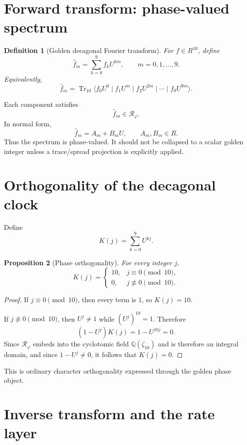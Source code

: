\documentclass[11pt]{article}
\newtheorem{definition}{Definition}[section]
\newtheorem{proposition}[definition]{Proposition}
\newcommand{\Tr}{\operatorname{Tr}}
\newcommand{\ph}{\varphi}
\newcommand{\Q}{\mathbb{Q}}
\newcommand{\RR}{\mathcal R_\ph}
\newcommand{\zz}{\zeta}
\begin{document}
\section{Forward transform: phase-valued spectrum}

\begin{definition}[Golden decagonal Fourier transform]
For $f\in R^{10}$, define
\[
    \widehat f_m=\sum_{k=0}^{9} f_kU^{km},
    \qquad
    m=0,1,\ldots,9.
\]
Equivalently,
\[
    \widehat f_m=
    \Tr_{10}\langle
        f_0U^0\mid f_1U^m\mid f_2U^{2m}\mid\cdots\mid f_9U^{9m}
    \rangle.
\]
\end{definition}

Each component satisfies
\[
    \widehat f_m\in\RR.
\]
In normal form,
\[
    \widehat f_m=A_m+B_mU,
    \qquad
    A_m,B_m\in R.
\]
Thus the spectrum is phase-valued.  It should not be collapsed to a scalar golden integer unless a trace/spread projection is explicitly applied.

\section{Orthogonality of the decagonal clock}

Define
\[
    K(j)=\sum_{k=0}^{9}U^{kj}.
\]

\begin{proposition}[Phase orthogonality]
For every integer $j$,
\[
    K(j)=
    \begin{cases}
        10,&j\equiv0\pmod{10},\\
        0,&j\not\equiv0\pmod{10}.
    \end{cases}
\]
\end{proposition}

\begin{proof}
If $j\equiv0\pmod{10}$, then every term is $1$, so $K(j)=10$.

If $j\not\equiv0\pmod{10}$, then $U^j\ne1$ while $(U^j)^{10}=1$.  Therefore
\[
    (1-U^j)K(j)=1-U^{10j}=0.
\]
Since $\RR$ embeds into the cyclotomic field $\Q(\zz_{10})$ and is therefore an integral domain, and since $1-U^j\ne0$, it follows that $K(j)=0$.
\end{proof}

This is ordinary character orthogonality expressed through the golden phase object.

\section{Inverse transform and the rate layer}
\end{document}
